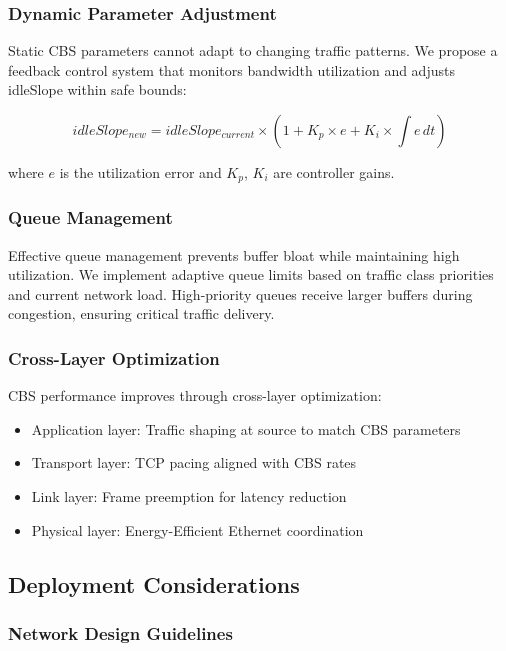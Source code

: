 \documentclass[10pt, journal, compsoc]{IEEEtran}
\begin{document}
\subsubsection{Dynamic Parameter Adjustment}

Static CBS parameters cannot adapt to changing traffic patterns. We propose a feedback control system that monitors bandwidth utilization and adjusts idleSlope within safe bounds:

\begin{equation}
idleSlope_{new} = idleSlope_{current} \times \left(1 + K_p \times e + K_i \times \int e \, dt\right)
\end{equation}

where $e$ is the utilization error and $K_p$, $K_i$ are controller gains.

\subsubsection{Queue Management}

Effective queue management prevents buffer bloat while maintaining high utilization. We implement adaptive queue limits based on traffic class priorities and current network load. High-priority queues receive larger buffers during congestion, ensuring critical traffic delivery.

\subsubsection{Cross-Layer Optimization}

CBS performance improves through cross-layer optimization:
\begin{itemize}
    \item Application layer: Traffic shaping at source to match CBS parameters
    \item Transport layer: TCP pacing aligned with CBS rates
    \item Link layer: Frame preemption for latency reduction
    \item Physical layer: Energy-Efficient Ethernet coordination
\end{itemize}

\subsection{Deployment Considerations}

\subsubsection{Network Design Guidelines}
\end{document}
